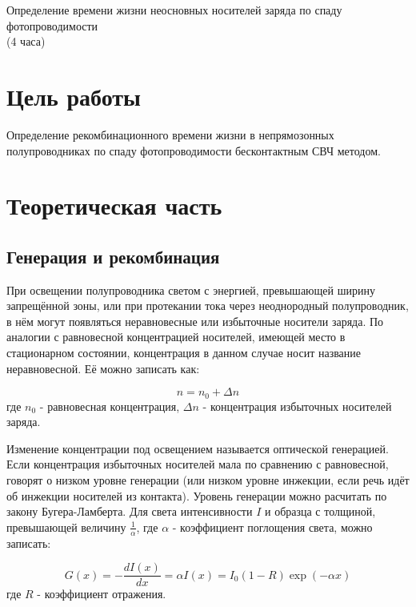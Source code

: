 \newpage

\setcounter{chapter}{4}

\begin{center}
Определение времени жизни неосновных носителей заряда по спаду фотопроводимости\\
(4 часа)
\end{center}

\section{Цель работы}
Определение рекомбинационного времени жизни в непрямозонных полупроводниках по спаду фотопроводимости бесконтактным СВЧ методом.

\section{Теоретическая часть}

\subsection{Генерация и рекомбинация}
При освещении полупроводника светом с энергией, превышающей ширину запрещённой зоны, или при протекании тока через неоднородный полупроводник, в нём могут появляться неравновесные или избыточные носители заряда. По аналогии с равновесной концентрацией носителей, имеющей место в стационарном состоянии, концентрация в данном случае носит название неравновесной. Её можно записать как:

\begin{equation}
n = n_{0} + \Delta n
\end{equation}
где $n_{0}$ - равновесная концентрация, $\Delta n$ - концентрация избыточных носителей заряда.

Изменение концентрации под освещением называется оптической генерацией. Если концентрация избыточных носителей мала по сравнению с равновесной, говорят о низком уровне генерации (или низком уровне инжекции, если речь идёт об инжекции носителей из контакта). Уровень генерации можно расчитать по закону Бугера-Ламберта. Для света интенсивности $I$ и образца с толщиной, превышающей величину $\frac{1}{\alpha}$, где $\alpha$ - коэффициент поглощения света, можно записать:

\begin{equation}
G(x) = -\frac{d I(x)}{d x} = \alpha I(x) = I_{0} (1-R) \exp(-\alpha x)
\end{equation}
где $R$ - коэффициент отражения.

